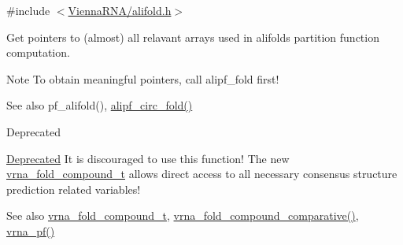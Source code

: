 {\ttfamily \#include $<$\hyperlink{alifold_8h}{Vienna\+R\+N\+A/alifold.\+h}$>$}



Get pointers to (almost) all relavant arrays used in alifold\textquotesingle{}s partition function computation. 

\begin{DoxyNote}{Note}
To obtain meaningful pointers, call alipf\+\_\+fold first!
\end{DoxyNote}
\begin{DoxySeeAlso}{See also}
pf\+\_\+alifold(), \hyperlink{group__consensus__pf__fold_ga604a42ad64178279551ad3e4def3d603}{alipf\+\_\+circ\+\_\+fold()}
\end{DoxySeeAlso}
\begin{DoxyRefDesc}{Deprecated}
\item[\hyperlink{deprecated__deprecated000024}{Deprecated}]It is discouraged to use this function! The new \hyperlink{group__fold__compound_ga1b0cef17fd40466cef5968eaeeff6166}{vrna\+\_\+fold\+\_\+compound\+\_\+t} allows direct access to all necessary consensus structure prediction related variables!\end{DoxyRefDesc}


\begin{DoxySeeAlso}{See also}
\hyperlink{group__fold__compound_ga1b0cef17fd40466cef5968eaeeff6166}{vrna\+\_\+fold\+\_\+compound\+\_\+t}, \hyperlink{group__fold__compound_gad6bacc816af274922b13d947f708aa0c}{vrna\+\_\+fold\+\_\+compound\+\_\+comparative()}, \hyperlink{group__pf__fold_ga29e256d688ad221b78d37f427e0e99bc}{vrna\+\_\+pf()}
\end{DoxySeeAlso}

